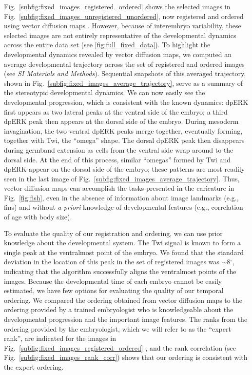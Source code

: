 \documentclass{pnastwo}
\newcommand{\SI}[0]{{\it SI Materials and Methods}}
\newcommand{\fig}[0]{Fig.}
\begin{document}
\begin{article}
\fig~\ref{subfig:fixed_images_registered_ordered} shows the selected images in \fig~\ref{subfig:fixed_images_unregistered_unordered}, now registered and ordered using vector diffusion maps \cite{singer2012vector}.
%
However, because of interembryo variability, these selected images are not entirely representative of the developmental dynamics across the entire data set (see \ref{fig:full_fixed_data}).
%
To highlight the developmental dynamics revealed by vector diffusion maps, we computed an average developmental trajectory across the set of registered and ordered images (see \SI). 
%
Sequential snapshots of this averaged trajectory, shown in \fig~\ref{subfig:fixed_images_average_trajectory}, serve as a summary of the stereotypic developmental dynamics.
%
We can now easily see the developmental progression, which is consistent with the known dynamics: 
dpERK first appears as two lateral peaks at the ventral side of the embryo; a third dpERK peak then appears at the dorsal side of the embryo.
%
During mesoderm invagination, the two ventral dpERK peaks merge together, eventually forming, together with Twi, the ``omega'' shape.
%
The dorsal dpERK peak then disappears during germband extension as cells from the ventral side wrap around to the dorsal side.
%
At the end of this process, similar ``omegas'' formed by Twi and dpERK appear on the dorsal side of the embryo; these patterns are most readily seen in the last image of \fig~\ref{subfig:fixed_images_average_trajectory}.
%
Thus, vector diffusion maps can accomplish the tasks presented in the caricature in \fig~\ref{fig:fish}, even in the absence of information about image landmarks (e.g., fins) and without {\it a priori} knowledge of developmental features (e.g., correlation of age with body size).

To evaluate the quality of our registration and ordering, we can use prior knowledge about the developmental system. 
%
The Twi signal is known to form a single peak at the ventralmost point of the embryo. 
%
We found that the standard deviation in the location of this peak in the set of registered images was $\sim$8$^\circ$,
indicating that the algorithm successfully aligns the ventralmost points of the images. 
%
Because the developmental time of each embryo cannot be easily estimated, we have few options for evaluating the quality of our temporal ordering. 
%
We compared the ordering obtained from vector diffusion maps to the ordering provided by a trained embryologist who is knowledgeable about the developmental progression and the important image features.  
%
The ranks from the ordering provided by the embryologist, which we will refer to as the ``expert rank'', are indicated for the images in \fig~\ref{subfig:fixed_images_registered_ordered} , and the rank correlation (see \fig~\ref{subfig:fixed_images_rank_corr}) shows that our ordering is consistent with the expert ordering. 


\end{article}
\end{document}
